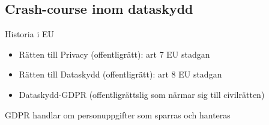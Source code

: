\begin{multicols}{2}
%
%
%
%
%

\section{Crash-course inom dataskydd}
Historia i EU
\begin{itemize}
\item Rätten till Privacy (offentligrätt): art 7 EU stadgan
\item Rätten till Dataskydd (offentligrätt): art 8 EU stadgan
\item Dataskydd-GDPR (offentligrättslig som närmar sig till civilrätten)
\end{itemize}

GDPR handlar om personuppgifter som sparras och hanteras


\end{multicols}
